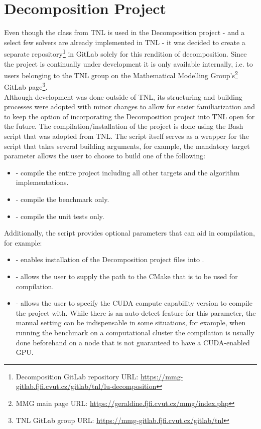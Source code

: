 \section{Decomposition Project \TO}\label{Section:implementation-decomposition-project}
Even though the  class from TNL is used in the Decomposition project - and a select few solvers are already implemented in TNL - it was decided to create a separate repository\footnote{\label{Footnote:decomposition-project-gitlab-url}Decomposition GitLab repository URL: \url{https://mmg-gitlab.fjfi.cvut.cz/gitlab/tnl/lu-decomposition}} in GitLab solely for this rendition of decomposition. Since the project is continually under development it is only available internally,
i.e. to users belonging to the TNL group on the Mathematical Modelling Group's\footnote{MMG main page URL: \url{https://geraldine.fjfi.cvut.cz/mmg/index.php}} GitLab page\footnote{TNL GitLab group URL: \url{https://mmg-gitlab.fjfi.cvut.cz/gitlab/tnl}}. \\
Although development was done outside of TNL, its structuring and building processes were adopted with minor changes to allow for easier familiarization and to keep the option of incorporating the Decomposition project into TNL open for the future. The compilation/installation of the project is done using the  Bash script that was adopted from TNL. The script itself serves as a wrapper for the  script that takes several building arguments, for example, the mandatory target parameter allows the user to choose to build one of the following:

\begin{itemize}
	\item {} - compile the entire project including all other targets and the algorithm implementations.
	\item {} - compile the benchmark only.
	\item {} - compile the unit tests only.
\end{itemize}

Additionally, the  script provides optional parameters that can aid in compilation, for example:
\begin{itemize}
	\item {} - enables installation of the Decomposition project files into .
	\item {} - allows the user to supply the path to the CMake that is to be used for compilation.
	\item {} - allows the user to specify the CUDA compute capability version to compile the project with. While there is an auto-detect feature for this parameter, the manual setting can be indispensable in some situations, for example, when running the benchmark on a computational cluster the compilation is usually done beforehand on a node that is not guaranteed to have a CUDA-enabled GPU. 
\end{itemize}

